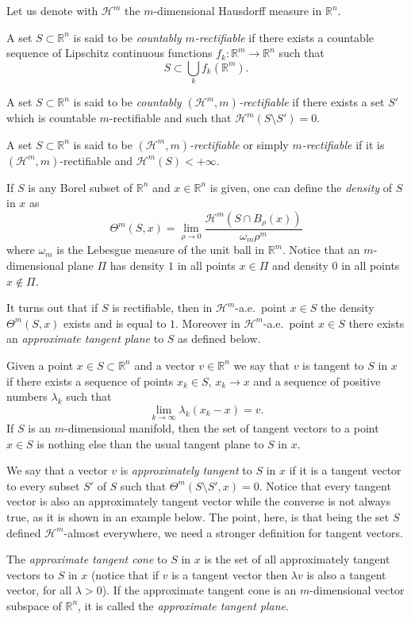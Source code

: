 \documentclass[12pt]{article}
\renewcommand{\H}{\mathcal H}
\newcommand{\R}{\mathbb R}
\begin{document}
Let us denote with $\H^m$ the $m$-dimensional Hausdorff measure in $\R^n$.

A set $S\subset \R^n$ is said to be \emph{countably $m$-rectifiable} if there exists a countable sequence of Lipschitz continuous functions $f_k\colon\R^m \to \R^n$ such that
\[
  S\subset \bigcup_k f_k(\R^m).
\]

A set $S\subset \R^n$ is said to be \emph{countably $(\H^m,m)$-rectifiable} if 
there exists a set $S'$ which is countable $m$-rectifiable and such that $\H^m(S\setminus S')=0$.

A set $S\subset \R^n$ is said to be \emph{$(\H^m,m)$-rectifiable} or simply \emph{$m$-rectifiable} if it is $(\H^m,m)$-rectifiable and $\H^m(S)<+\infty$. 

If $S$ is any Borel subset of $\R^n$ and
$x\in \R^n$ is given, one can define the \emph{density} of $S$ in $x$ as
\[
  \Theta^m(S,x) = \lim_{\rho \to 0} \frac{\H^m(S\cap B_\rho(x))}
{\omega_m \rho^m}
\]
where $\omega_m$ is the Lebesgue measure of the unit ball in $\R^m$. Notice that an $m$-dimensional plane $\Pi$ has density $1$ in all points $x\in\Pi$ and density $0$ in all points $x\not\in\Pi$.

It turns out that if $S$ is rectifiable, then in $\H^m$-a.e.\ point $x\in S$ the density $\Theta^m(S,x)$ exists and is equal to $1$. Moreover in $\H^m$-a.e.\ point $x\in S$ there exists an \emph{approximate tangent plane} to $S$ as defined below.

Given a point $x\in S\subset \R^n$ and a vector $v\in \R^n$ we say that $v$ is tangent to $S$ in $x$ if there exists a sequence of points $x_k\in S$, $x_k\to x$ and a sequence of positive numbers $\lambda_k$ such that 
\[
  \lim_{k\to \infty} \lambda_k (x_k -x) = v.
\]
If $S$ is an $m$-dimensional manifold, then the set of tangent vectors to a point $x\in S$ is nothing else than the usual tangent plane to $S$ in $x$.

We say that a vector $v$ is \emph{approximately tangent} to $S$ in $x$ if it is 
a tangent vector to every subset $S'$ of $S$ such that $\Theta^m(S\setminus S',x)=0$. Notice that every tangent vector is also an approximately tangent vector while the converse is not always true, as it is shown in an example below. The point, here, is that being the set $S$ defined $\H^m$-almost everywhere, we need a stronger definition for tangent vectors.

The \emph{approximate tangent cone} to $S$ in $x$ is the set of all approximately tangent vectors to $S$ in $x$ (notice that if $v$ is a tangent vector then $\lambda v$ is also a tangent vector, for all $\lambda>0$).
If the approximate tangent cone is an $m$-dimensional vector subspace of $\R^n$, it is called the \emph{approximate tangent plane}.
\end{document}
